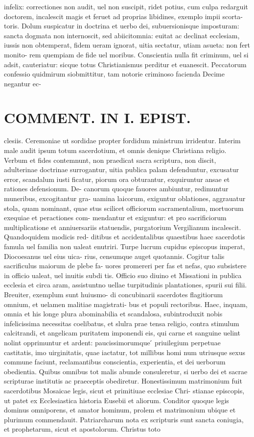 \documentclass{article}
\begin{document}
\begin{pages}
infelix: correctiones non audit, uel non suscipit, ridet potius, cum culpa redarguit doctorem, incalescit magis et feruet ad proprias libidines, exemplo impii scorta- toris. Dolum suspicatur in doctrina et uerbo dei, subuersionisque imposturam: sancta dogmata non internoscit, sed abiicitomnia: euitat ac declinat ecclesiam, iussis non obtemperat, fidem ueram ignorat, uitia sectatur, utiam asueta: non fert monito- rem quempiam de fide uel moribus. Conscientia nulla fit criminum, uel si adsit, cauteriatur: sicque totus Christianismus perditur et euanescit. Peccatorum confessio quidmirum siobmittitur, tam notorie criminoso facienda Decime negantur ec-  \pend
\section*{COMMENT. IN I. EPIST. }
\marginpar{[ p.494 ]}\pstart clesiis. Ceremoniae ut sordidae propter fordidum ministrum irridentur. Interim male audit ipsum totum sacerdotium, et omnis denique Christiana religio. Verbum et fides contemnunt, non praedicat sacra scriptura, non discit, adulterinae doctrinae surrogantur, uitia publica palam defenduntur, excusatur error, scandalum iusti ficatur, piorum ora obturantur, exquiruntur ansae et rationes defensionum. De- canorum quoque fauores ambiuntur, redimuntur muneribus, excogitantur gra- uamina laicorum, exiguntur oblationes, aggrauatur stola, quam nominant, quae stus scilicet officiorum sacramentalium, mortuorum exequiae et peractiones com- mendantur et exiguntur: et pro sacrificiorum multiplicatione et anniuersariis statuendis, purgatorium Vergilianum incalescit. Quandoquidem modicis red- ditibus et accidentalibus quaestibus haec sacerdotis famula uel familia non ualeat enutriri. Turpe lucrum cupidus episcopus imperat, Diocoesanus uel eius uica- rius, censumque auget quotannis. Cogitur talis sacrificulus maiorum de plebe fa- uores promereri per fas et nefas, quo subsistere in officio ualeat, uel inuitis subdi tis. Officio suo diuino et Missationi in publica ecclesia et circa aram, assistuntno uellae turpitudinis plantationes, spurii sui filii. Breuiter, exemplum sunt huiusmo- di concubinarii sacerdotes flagitiorum omnium, et uelamen malitiae magistrati- bus et populi rectoribus. Haec, inquam, omnia et his longe plura abominabilia et scandalosa, subintroduxit nobis infelicissima necessitas coelibatus, et slulra prae tensa religio, contra stimulum calcitrandi, et angelicam puritatem imponendi eis, qui carne et sanguine uelint nolint opprimuntur et ardent: paucissimorumque ́ priuilegium perpetuae castitatis, imo uirginitatis, quae iactatur, tot millibus homi num utriusque sexus commune faciunt, reclamantibus conscientia, experientia, et dei uerborum obedientia. Quibus omnibus tot malis abunde consuleretur, si uerbo dei et sacrae scripturae institutis ac praeceptis obediretur. Honestissimum matrimonium fuit sacerdotibus Mosaicae legis, sicut et primitiuae ecclesiae Chri- stianae episcopis, ut patet ex Ecclesiastica historia Eusebii et aliorum. Conditor quoque legis dominus omniporens, et amator hominum, prolem et matrimonium ubique et plurimum commendauit. Patriarcharum nota ex scripturis sunt sancta coniugia, et prophetarum, sicut et apostolorum. Christus toto 
\end{pages}
\end{document}
